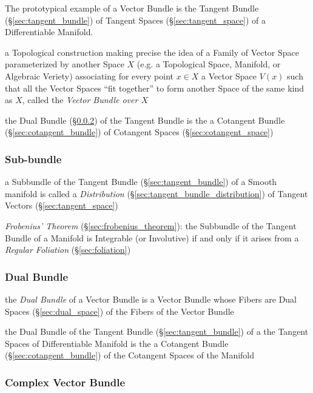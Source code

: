 The prototypical example of a Vector Bundle is the Tangent Bundle
(\S\ref{sec:tangent_bundle}) of Tangent Spaces (\S\ref{sec:tangent_space}) of a
Differentiable Manifold.

a Topological construction making precise the idea of a Family of Vector Space
parameterized by another Space $X$ (e.g. a Topological Space, Manifold, or
Algebraic Veriety) associating for every point $x \in X$ a Vector Space $V(x)$
such that all the Vector Spaces ``fit together'' to form another Space of the
same kind as $X$, called the \emph{Vector Bundle over $X$}

the Dual Bundle (\S\ref{sec:dual_bundle}) of the Tangent Bundle is the
a Cotangent Bundle (\S\ref{sec:cotangent_bundle}) of
Cotangent Spaces (\S\ref{sec:cotangent_space})



\subsubsection{Sub-bundle}\label{sec:subbundle}

\fist a Subbundle of the Tangent Bundle (\S\ref{sec:tangent_bundle}) of a
Smooth manifold is called a \emph{Distribution}
(\S\ref{sec:tangent_bundle_distribution}) of Tangent Vectors
(\S\ref{sec:tangent_space})


\emph{Frobenius' Theorem} (\S\ref{sec:frobenius_theorem}): the Subbundle of the
Tangent Bundle of a Manifold is Integrable (or Involutive) if and only if it
arises from a \emph{Regular Foliation} (\S\ref{sec:foliation})



\subsubsection{Dual Bundle}\label{sec:dual_bundle}

the \emph{Dual Bundle} of a Vector Bundle is a Vector Bundle whose Fibers are
Dual Spaces (\S\ref{sec:dual_space}) of the Fibers of the Vector Bundle

the Dual Bundle of the Tangent Bundle (\S\ref{sec:tangent_bundle}) of a the
Tangent Spaces of Differentiable Manifold is the a Cotangent Bundle
(\S\ref{sec:cotangent_bundle}) of the Cotangent Spaces of the Manifold



\subsubsection{Complex Vector Bundle}\label{sec:complex_vector_bundle}



